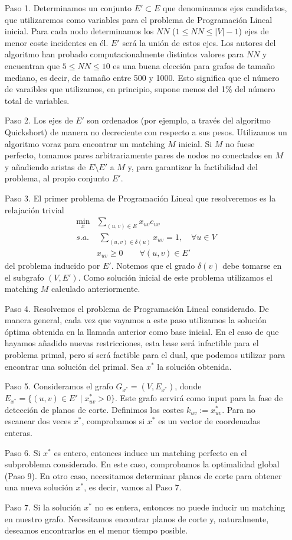 \documentclass[twoside,a4paper,openright,12pt,tikz]{book}
\begin{document}
\begin{itemize}
\item[Paso 1.] Determinamos un conjunto $E'\subset E$ que denominamos ejes candidatos, que utilizaremos como variables para el problema de Programación Lineal inicial. Para cada nodo determinamos los $NN$ ($1\leq NN \leq |V|-1$) ejes de menor coste incidentes en él. $E'$ será la unión de estos ejes. Los autores del algoritmo han probado computacionalmente distintos valores para $NN$ y encuentran que $5\leq NN \leq 10$ es una buena elección para grafos de tamaño mediano, es decir, de tamaño entre 500 y 1000. Esto significa que el número de varaibles que utilizamos, en principio, supone menos del 1\% del número total de variables. 
\item[Paso 2.] Los ejes de $E'$ son ordenados (por ejemplo, a través del algoritmo Quickshort) de manera no decreciente con respecto a sus pesos. Utilizamos un algoritmo voraz para encontrar un matching $M$ inicial. Si $M$ no fuese perfecto, tomamos pares arbitrariamente pares de nodos no conectados en $M$ y añadiendo aristas de $E\setminus E'$ a $M$ y, para garantizar la factibilidad del problema, al propio conjunto $E'$. 
\item[Paso 3.] El primer problema de Programación Lineal que resolveremos es la relajación trivial 
\begin{align*}
\min_x & \sum_{(u,v) \in E}x_{uv}c_{uv}\\
s.a.&\;\sum_{(u,v)\in\delta(u)} x_{uv} = 1, \quad \forall u \in V\\
&x_{uv} \geq 0 \qquad \forall(u,v)\in E'
\end{align*}
del problema inducido por $E'$. Notemos que el grado $\delta(v)$ debe tomarse en el subgrafo $(V,E')$. Como solución inicial de este problema utilizamos el matching $M$ calculado anteriormente.
\newpage
\item[Paso 4.] Resolvemos el problema de Programación Lineal considerado. De manera general, cada vez que vayamos a este paso utilizamos la solución óptima obtenida en la llamada anterior como base inicial. En el caso de que hayamos añadido nuevas restricciones, esta base será infactible para el problema primal, pero sí será factible para el dual, que podemos utilizar para encontrar una solución del primal. Sea $x^*$ la solución obtenida.
\item[Paso 5.] Consideramos el grafo $G_{x^*}=(V,E_{x^*})$, donde $E_{x^*} =\{(u,v)\in E'\mid x^*_{uv}>0\}$. Este grafo servirá como input para la fase de detección de planos de corte. Definimos los costes $k_{uv}:=x^*_{uv}$. Para no escanear dos veces $x^*$, comprobamos si $x^*$ es un vector de coordenadas enteras.
\item[Paso 6.] Si $x^*$ es entero, entonces induce un matching perfecto en el subproblema considerado. En este caso, comprobamos la optimalidad global (Paso 9). En otro caso, necesitamos determinar planos de corte para obtener una nueva solución $x^*$, es decir, vamos al Paso 7.
\item[Paso 7.] Si la solución $x^*$ no es entera, entonces no puede inducir un matching en nuestro grafo. Necesitamos encontrar planos de corte y, naturalmente, deseamos encontrarlos en el menor tiempo posible.


\end{itemize}
\end{document}
